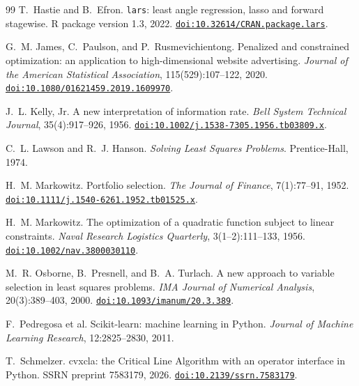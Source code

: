 \documentclass[11pt]{article}
\begin{document}
\begin{thebibliography}{99}
T.~Hastie and B.~Efron.
\newblock \texttt{lars}: least angle regression, lasso and forward stagewise.
\newblock R package version 1.3, 2022.
\newblock \href{https://doi.org/10.32614/CRAN.package.lars}{\texttt{doi:10.32614/CRAN.package.lars}}.

G.~M. James, C.~Paulson, and P.~Rusmevichientong.
\newblock Penalized and constrained optimization: an application to high-dimensional
website advertising.
\newblock \emph{Journal of the American Statistical Association}, 115(529):107--122,
2020.
\newblock \href{https://doi.org/10.1080/01621459.2019.1609970}{\texttt{doi:10.1080/01621459.2019.1609970}}.

J.~L. Kelly, Jr.
\newblock A new interpretation of information rate.
\newblock \emph{Bell System Technical Journal}, 35(4):917--926, 1956.
\newblock \href{https://doi.org/10.1002/j.1538-7305.1956.tb03809.x}{\texttt{doi:10.1002/j.1538-7305.1956.tb03809.x}}.

C.~L. Lawson and R.~J. Hanson.
\newblock \emph{Solving Least Squares Problems}.
\newblock Prentice-Hall, 1974.

H.~M. Markowitz.
\newblock Portfolio selection.
\newblock \emph{The Journal of Finance}, 7(1):77--91, 1952.
\newblock \href{https://doi.org/10.1111/j.1540-6261.1952.tb01525.x}{\texttt{doi:10.1111/j.1540-6261.1952.tb01525.x}}.

H.~M. Markowitz.
\newblock The optimization of a quadratic function subject to linear constraints.
\newblock \emph{Naval Research Logistics Quarterly}, 3(1--2):111--133, 1956.
\newblock \href{https://doi.org/10.1002/nav.3800030110}{\texttt{doi:10.1002/nav.3800030110}}.

M.~R. Osborne, B.~Presnell, and B.~A. Turlach.
\newblock A new approach to variable selection in least squares problems.
\newblock \emph{IMA Journal of Numerical Analysis}, 20(3):389--403, 2000.
\newblock \href{https://doi.org/10.1093/imanum/20.3.389}{\texttt{doi:10.1093/imanum/20.3.389}}.

F.~Pedregosa et al.
\newblock Scikit-learn: machine learning in Python.
\newblock \emph{Journal of Machine Learning Research}, 12:2825--2830, 2011.

T.~Schmelzer.
\newblock cvxcla: the Critical Line Algorithm with an operator interface in Python.
\newblock SSRN preprint 7583179, 2026.
\newblock \href{https://doi.org/10.2139/ssrn.7583179}{\texttt{doi:10.2139/ssrn.7583179}}.


\end{thebibliography}
\end{document}
